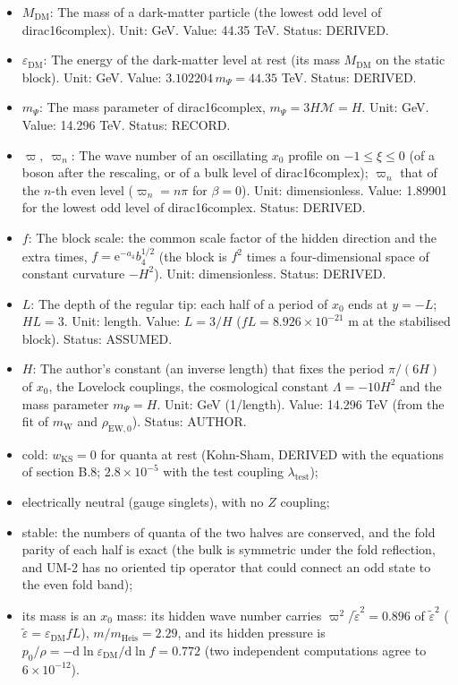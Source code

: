 \documentclass[
  10pt,
]{article}
\providecommand{\tightlist}{%
  \setlength{\itemsep}{0pt}\setlength{\parskip}{0pt}}
\begin{document}
\begin{itemize}
\tightlist
\item
  \(M_{\mathrm{DM}}\): The mass of a dark-matter particle (the lowest
  odd level of dirac16complex). Unit: GeV. Value: 44.35 TeV. Status:
  DERIVED.
\item
  \(\varepsilon_{\mathrm{DM}}\): The energy of the dark-matter level at
  rest (its mass \(M_{\mathrm{DM}}\) on the static block). Unit: GeV.
  Value: \(3.102204\,m_\Psi = 44.35\) TeV. Status: DERIVED.
\item
  \(m_\Psi\): The mass parameter of dirac16complex,
  \(m_\Psi = 3H\mathcal{M} = H\). Unit: GeV. Value: 14.296 TeV. Status:
  RECORD.
\item
  \(\varpi,\ \varpi_n\): The wave number of an oscillating \(x_0\)
  profile on \(-1 \le \xi \le 0\) (of a boson after the rescaling, or of
  a bulk level of dirac16complex); \(\varpi_n\) that of the \(n\)-th
  even level (\(\varpi_n = n\pi\) for \(\beta = 0\)). Unit:
  dimensionless. Value: 1.89901 for the lowest odd level of
  dirac16complex. Status: DERIVED.
\item
  \(f\): The block scale: the common scale factor of the hidden
  direction and the extra times, \(f = \mathrm{e}^{-a_4}b_4^{1/2}\) (the
  block is \(f^2\) times a four-dimensional space of constant curvature
  \(-H^2\)). Unit: dimensionless. Status: DERIVED.
\item
  \(L\): The depth of the regular tip: each half of a period of \(x_0\)
  ends at \(y = -L\); \(HL = 3\). Unit: length. Value: \(L = 3/H\)
  (\(fL = 8.926\times10^{-21}\) m at the stabilised block). Status:
  ASSUMED.
\item
  \(H\): The author's constant (an inverse length) that fixes the period
  \(\pi/(6H)\) of \(x_0\), the Lovelock couplings, the cosmological
  constant \(\Lambda = -10H^2\) and the mass parameter \(m_\Psi = H\).
  Unit: GeV (1/length). Value: 14.296 TeV (from the fit of
  \(m_{\mathrm{W}}\) and \(\rho_{\mathrm{EW},0}\)). Status: AUTHOR.
\end{itemize}

\begin{itemize}
\tightlist
\item
  cold: \(w_{\mathrm{KS}} = 0\) for quanta at rest (Kohn-Sham, DERIVED
  with the equations of section B.8; \(2.8\times10^{-5}\) with the test
  coupling \(\lambda_{\mathrm{test}}\));
\item
  electrically neutral (gauge singlets), with no \(Z\) coupling;
\item
  stable: the numbers of quanta of the two halves are conserved, and the
  fold parity of each half is exact (the bulk is symmetric under the
  fold reflection, and UM-2 has no oriented tip operator that could
  connect an odd state to the even fold band);
\item
  its mass is an \(x_0\) mass: its hidden wave number carries
  \(\varpi^2/\tilde\varepsilon^2 = 0.896\) of \(\tilde\varepsilon^2\)
  (\(\tilde\varepsilon = \varepsilon_{\mathrm{DM}}fL\)),
  \(m/m_{\mathrm{Heis}} = 2.29\), and its hidden pressure is
  \(p_0/\rho = -\mathrm{d}\ln\varepsilon_{\mathrm{DM}}/\mathrm{d}\ln f = 0.772\)
  (two independent computations agree to \(6\times10^{-12}\)).
\end{itemize}
\end{document}
